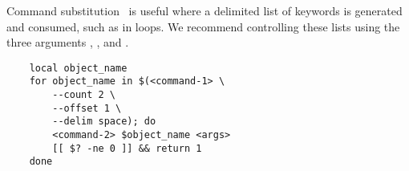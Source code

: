 Command substitution~\cite{command_substitution} is useful where a delimited list of keywords is generated and consumed, such as in  loops. We recommend controlling these lists using the three arguments , , and .
%
\begin{verbatim}
    local object_name
    for object_name in $(<command-1> \
        --count 2 \
        --offset 1 \
        --delim space); do
        <command-2> $object_name <args>
        [[ $? -ne 0 ]] && return 1
    done
\end{verbatim}